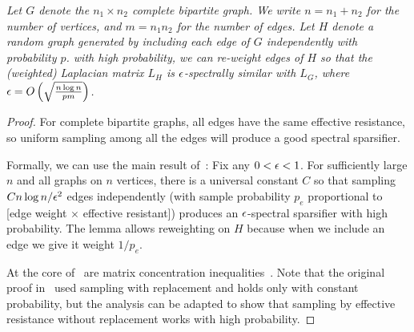 {\enspace \em
Let $G$ denote the $n_1 \times n_2$ complete bipartite graph.
We write $n = n_1 + n_2$ for the number of vertices, and $m = n_1 n_2$ for the number of edges.
Let $H$ denote a random graph generated by including each edge of $G$ independently with probability $p$.
with high probability, we can re-weight edges of $H$ so that the (weighted) Laplacian matrix $L_H$ is $\epsilon$-spectrally similar with $L_G$, where $\epsilon = O\left(\sqrt{\frac{n \log n}{p m}}\right)$.
}
\begin{proof}
For complete bipartite graphs, all edges have the same effective resistance, so uniform sampling among all the edges will produce a good spectral sparsifier.

Formally, we can use the main result of~\cite{SpielmanS11}: Fix any $0 < \epsilon < 1$. For sufficiently large $n$ and all graphs on $n$ vertices, there is a universal constant $C$ so that sampling $C n \log n/\epsilon^2$ edges independently (with sample probability $p_e$ proportional to [edge weight $\times$ effective resistant]) produces an $\epsilon$-spectral sparsifier with high probability.
The lemma allows reweighting on $H$ because when we include an edge we give it weight $1/p_e$.

At the core of~\citep{SpielmanS11} are matrix concentration inequalities~\citep{RudelsonV07, AhlswedeW02, Tropp12}.
Note that the original proof in~\citep{SpielmanS11} used sampling with replacement and holds only with constant probability, but the analysis can be adapted to show that sampling by effective resistance without replacement works with high probability.
\end{proof}

